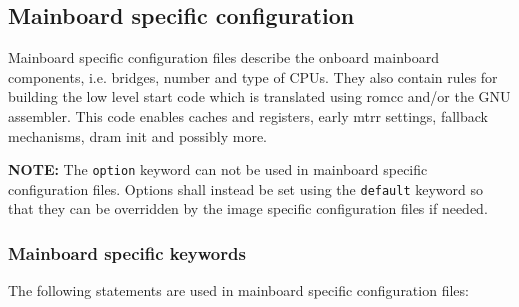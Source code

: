 \documentclass[titlepage,12pt]{article}
\begin{document}
\newpage

\subsection{Mainboard specific configuration}

Mainboard specific configuration files describe the onboard
mainboard components, i.e. bridges, number and type of CPUs. They also
contain rules for building the low level start code which is translated
using romcc and/or the GNU assembler.  This code enables caches and
registers, early mtrr settings, fallback mechanisms, dram init and
possibly more.

\textbf{NOTE:} The \texttt{option} keyword can not be used in mainboard
specific configuration files.  Options shall instead be set using the
\texttt{default} keyword so that they can be overridden by the image
specific configuration files if needed.

\subsubsection{Mainboard specific keywords}

The following statements are used in mainboard specific configuration
files:
\end{document}
